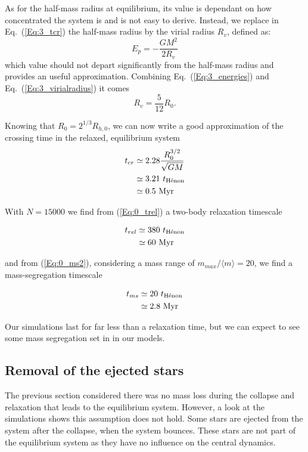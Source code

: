 As for the half-mass radius at equilibrium, its value is dependant on how concentrated the system is and is not easy to derive. Instead, we replace in Eq.~(\ref{Eq:3_tcr}) the half-mass radius by the virial radius $R_v$, defined as:
\begin{equation}
\label{Eq:3_virialradius}
E_p = - \frac{G M^2}{2 R_v}
\end{equation}
which value should not depart significantly from the half-mass radius and provides an useful approximation. Combining Eq.~(\ref{Eq:3_energies}) and Eq.~(\ref{Eq:3_virialradius}) it comes
\begin{equation}
R_v = \frac{5}{12} R_0.
\end{equation}


Knowing that $R_0 = 2^{1/3} R_{h,0}$, we can now write a good approximation of the crossing time in the relaxed, equilibrium system
\begin{align}
t_{cr}  &\simeq 2.28 \frac{R_0^{3/2}}{\sqrt{GM}}\\
        &\simeq 3.21~ t_{\textrm{H\'enon}}\\
	    &\simeq 0.5~ {\textrm{Myr}}
\end{align}

 With $N = 15 000$  we find from (\ref{Eq:0_trel}) a two-body relaxation timescale

\begin{align}
t_{rel}  &\simeq 380~ t_{\textrm{H\'enon}}\\
	     &\simeq 60~ {\textrm{Myr}}
\end{align}

and from (\ref{Eq:0_ms2}), considering a mass range of $m_{max}/\langle m\rangle = 20$, we find a mass-segregation timescale

\begin{align}
t_{ms}  &\simeq 20~ t_{\textrm{H\'enon}}\\
	    &\simeq 2.8~ {\textrm{Myr}}
\end{align}

Our simulations last for far less than a relaxation time, but we can expect to see some mass segregation set in in our models.


\subsection{Removal of the ejected stars}

The previous section considered there was no mass loss during the collapse and relaxation that leads to the equilibrium system. However, a look at the simulations shows this assumption does not hold. Some stars are ejected from the system after the collapse, when the system bounces. These stars are not part of the equilibrium system as they have no influence on the central dynamics.

